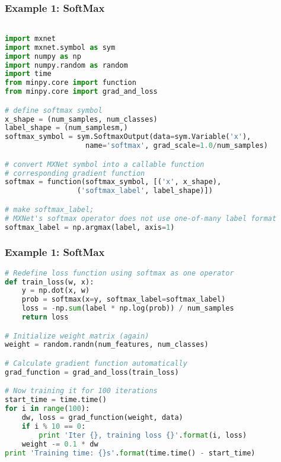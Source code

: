 \begin{frame}[fragile]
  \MyLogo
  \frametitle{Example 1: SoftMax}  

\scriptsize{
\begin{lstlisting}[language=python]

import mxnet
import mxnet.symbol as sym
import numpy as np
import numpy.random as random
import time
from minpy.core import function
from minpy.core import grad_and_loss

# define softmax symbol
x_shape = (num_samples, num_classes)
label_shape = (num_samplesm,)
softmax_symbol = sym.SoftmaxOutput(data=sym.Variable('x'), 
                   name='softmax', grad_scale=1.0/num_samples)

# convert MXNet symbol into a callable function 
# corresponding gradient function
softmax = function(softmax_symbol, [('x', x_shape), 
                 ('softmax_label', label_shape)])

# make softmax_label; 
# MXNet's softmax operator does not use one-of-many label format
softmax_label = np.argmax(label, axis=1)
\end{lstlisting}
}
\end{frame}

\begin{frame}[fragile]
  \MyLogo
  \frametitle{Example 1: SoftMax}  
\ContinueLineNumber
\scriptsize{
\begin{lstlisting}[language=python]
# Redefine loss function using softmax as one operator
def train_loss(w, x):
    y = np.dot(x, w)
    prob = softmax(x=y, softmax_label=softmax_label)
    loss = -np.sum(label * np.log(prob)) / num_samples
    return loss

# Initialize weight matrix (again)
weight = random.randn(num_features, num_classes)

# Calculate gradient function automatically
grad_function = grad_and_loss(train_loss)

# Now training it for 100 iterations
start_time = time.time()
for i in range(100):
    dw, loss = grad_function(weight, data)
    if i % 10 == 0:
        print 'Iter {}, training loss {}'.format(i, loss)
    weight -= 0.1 * dw
print 'Training time: {}s'.format(time.time() - start_time)
\end{lstlisting}
}
\end{frame}